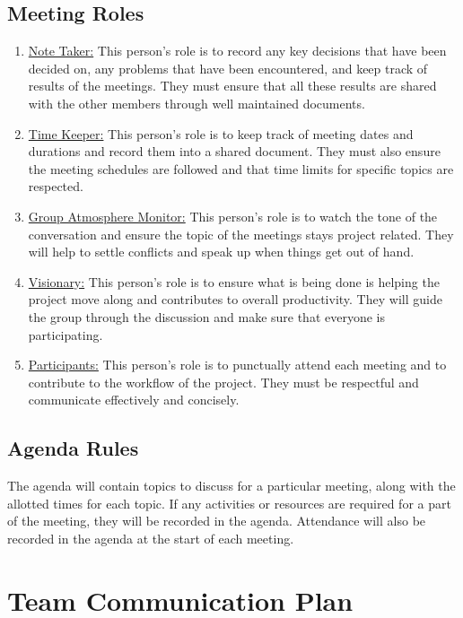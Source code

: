 \documentclass{article}
\begin{document}
\subsection{Meeting Roles}
\begin{enumerate}
    \item \underline{Note Taker:} This person's role is to record any key decisions that have been decided on, any problems that have been encountered, and keep track of results of the meetings. They must ensure that all these results are shared with the other members through well maintained documents.
    \item \underline{Time Keeper:} This person's role is to keep track of meeting dates and durations and record them into a shared document. They must also ensure the meeting schedules are followed and that time limits for specific topics are respected.
    \item \underline{Group Atmosphere Monitor:} This person's role is to watch the tone of the conversation and ensure the topic of the meetings stays project related. They will help to settle conflicts and speak up when things get out of hand.
    \item \underline{Visionary:} This person’s role is to ensure what is being done is helping the project move along and contributes to overall productivity. They will guide the group through the discussion and make sure that everyone is participating.
    \item \underline{Participants:} This person’s role is to punctually attend each meeting and to contribute to the workflow of the project. They must be respectful and communicate effectively and concisely.
    
\end{enumerate}

\subsection{Agenda Rules}
The agenda will contain topics to discuss for a particular meeting, along with the allotted times for each topic. If any activities or resources are required for a part of the meeting, they will be recorded in the agenda. Attendance will also be recorded in the agenda at the start of each meeting.

\section{Team Communication Plan}
\end{document}
